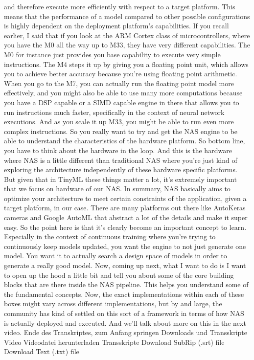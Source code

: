 {{{{    and therefore execute more efficiently with respect to a target platform.
    This means that the performance of a model compared
    to other possible configurations is highly dependent on the deployment
    platform's capabilities.
    If you recall earlier, I said that if you look at the ARM Cortex
    class of microcontrollers, where you have the M0 all the way up to M33,
    they have very different capabilities.
    The M0 for instance just provides you base capability
    to execute very simple instructions.
    The M4 steps it up by giving you a floating point
    unit, which allows you to achieve better accuracy because you're
    using floating point arithmetic.
    When you go to the M7, you can actually run the floating point model
    more effectively, and you might also be able to use many more computations
    because you have a DSP capable or a SIMD capable
    engine in there that allows you to run instructions much faster, specifically
    in the context of neural network executions.
    And as you scale it up M33, you might be able to run
    even more complex instructions.
    So you really want to try and get the NAS engine
    to be able to understand the characteristics of the hardware
    platform.
    So bottom line, you have to think about the hardware in the loop.
    And this is the hardware where NAS is a little different than traditional NAS
    where you're just kind of exploring the architecture independently
    of these hardware specific platforms.
    But given that in TinyML these things matter a lot,
    it's extremely important that we focus on hardware of our NAS.
    In summary, NAS basically aims to optimize your architecture
    to meet certain constraints of the application, given a target platform,
    in our case.
    There are many platforms out there like AutoKeras cameras
    and Google AutoML that abstract a lot of the details and make it super easy.
    So the point here is that it's clearly become an important concept to learn.
    Especially in the context of continuous training
    where you're trying to continuously keep models updated,
    you want the engine to not just generate one model.
    You want it to actually search a design space of models
    in order to generate a really good model.
    Now, coming up next, what I want to do is
    I want to open up the hood a little bit and tell you
    about some of the core building blocks that are there inside the NAS pipeline.
    This helps you understand some of the fundamental concepts.
    Now, the exact implementations within each of these boxes
    might vary across different implementations,
    but by and large, the community has kind of settled on this sort of a framework
    in terms of how NAS is actually deployed and executed.
    And we'll talk about more on this in the next video.
    Ende des Transkriptes, zum Anfang springen
    Downloads und Transskripte
    Video
    Videodatei herunterladen
    Transskripte
    Download SubRip (.srt) file
    Download Text (.txt) file 
 
}}}}
